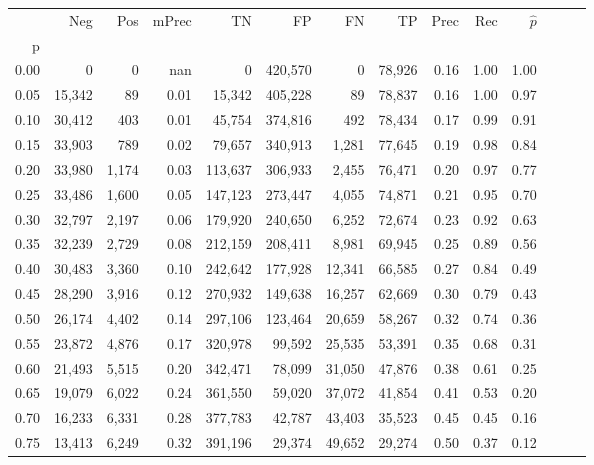 \begin{tabular}{rrrrrrrrrrrrrr}
\toprule
{} &     Neg &    Pos & mPrec &       TN &       FP &      FN &      TP &  Prec &   Rec & $\hat{p}$ \\
p    &         &        &       &          &          &         &         &       &       &           \\
\midrule
0.00 &       0 &      0 &   nan &        0 &  420,570 &       0 &  78,926 &  0.16 &  1.00 &      1.00 \\
0.05 &  15,342 &     89 &  0.01 &   15,342 &  405,228 &      89 &  78,837 &  0.16 &  1.00 &      0.97 \\
0.10 &  30,412 &    403 &  0.01 &   45,754 &  374,816 &     492 &  78,434 &  0.17 &  0.99 &      0.91 \\
0.15 &  33,903 &    789 &  0.02 &   79,657 &  340,913 &   1,281 &  77,645 &  0.19 &  0.98 &      0.84 \\
0.20 &  33,980 &  1,174 &  0.03 &  113,637 &  306,933 &   2,455 &  76,471 &  0.20 &  0.97 &      0.77 \\
0.25 &  33,486 &  1,600 &  0.05 &  147,123 &  273,447 &   4,055 &  74,871 &  0.21 &  0.95 &      0.70 \\
0.30 &  32,797 &  2,197 &  0.06 &  179,920 &  240,650 &   6,252 &  72,674 &  0.23 &  0.92 &      0.63 \\
0.35 &  32,239 &  2,729 &  0.08 &  212,159 &  208,411 &   8,981 &  69,945 &  0.25 &  0.89 &      0.56 \\
0.40 &  30,483 &  3,360 &  0.10 &  242,642 &  177,928 &  12,341 &  66,585 &  0.27 &  0.84 &      0.49 \\
0.45 &  28,290 &  3,916 &  0.12 &  270,932 &  149,638 &  16,257 &  62,669 &  0.30 &  0.79 &      0.43 \\
0.50 &  26,174 &  4,402 &  0.14 &  297,106 &  123,464 &  20,659 &  58,267 &  0.32 &  0.74 &      0.36 \\
0.55 &  23,872 &  4,876 &  0.17 &  320,978 &   99,592 &  25,535 &  53,391 &  0.35 &  0.68 &      0.31 \\
0.60 &  21,493 &  5,515 &  0.20 &  342,471 &   78,099 &  31,050 &  47,876 &  0.38 &  0.61 &      0.25 \\
0.65 &  19,079 &  6,022 &  0.24 &  361,550 &   59,020 &  37,072 &  41,854 &  0.41 &  0.53 &      0.20 \\
0.70 &  16,233 &  6,331 &  0.28 &  377,783 &   42,787 &  43,403 &  35,523 &  0.45 &  0.45 &      0.16 \\
0.75 &  13,413 &  6,249 &  0.32 &  391,196 &   29,374 &  49,652 &  29,274 &  0.50 &  0.37 &      0.12 \\

\end{tabular}
